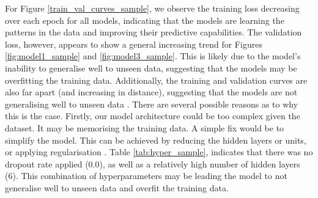 For Figure \ref{train_val_curves_sample}, we observe the training loss decreasing over each epoch for all models, indicating that the models are learning the patterns in the data and improving their predictive capabilities. The validation loss, however, appears to show a general increasing trend for Figures \ref{fig:model1_sample} and \ref{fig:model3_sample}. This is likely due to the model's inability to generalise well to unseen data, suggesting that the models may be overfitting the training data. Additionally, the training and validation curves are also far apart (and increasing in distance), suggesting that the models are not generalising well to unseen data \cite{diaz2017effective}. There are several possible reasons as to why this is the case. Firstly, our model architecture could be too complex given the dataset. It may be memorising the training data. A simple fix would be to simplify the model. This can be achieved by reducing the hidden layers or units, or applying regularisation \cite{bergstra2011algorithms}. Table \ref{tab:hyper_sample}, indicates that there was no dropout rate applied (0.0), as well as a relatively high number of hidden layers (6). This combination of hyperparameters may be leading the model to not generalise well to unseen data and overfit the training data. 

